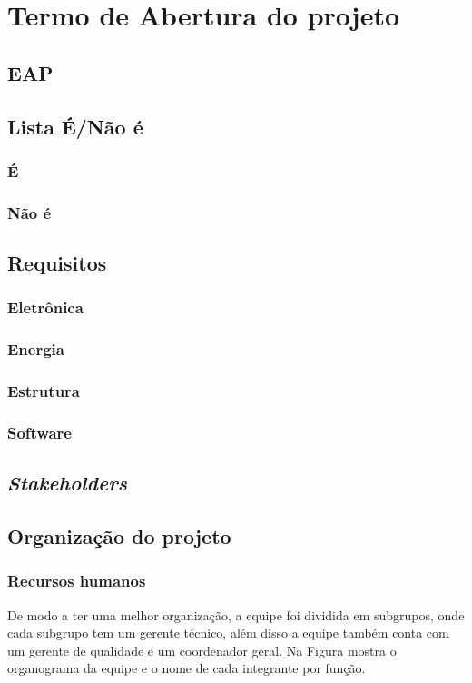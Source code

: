 \chapter{Termo de Abertura do projeto}

\section{EAP}
\section{Lista É/Não é}
\subsection{É}
\subsection{Não é}
\section{Requisitos}
\subsection{Eletrônica}
\subsection{Energia}
\subsection{Estrutura}
\subsection{Software}
\section{\emph{Stakeholders}}
\section{Organização do projeto}

\subsection{Recursos humanos}
  
  De modo a ter uma melhor organização, a equipe foi dividida em subgrupos, onde cada subgrupo tem um gerente técnico, além disso a equipe também conta com um gerente de qualidade e um coordenador geral. Na Figura %
 mostra o organograma da equipe e o nome de cada integrante por função.
  
